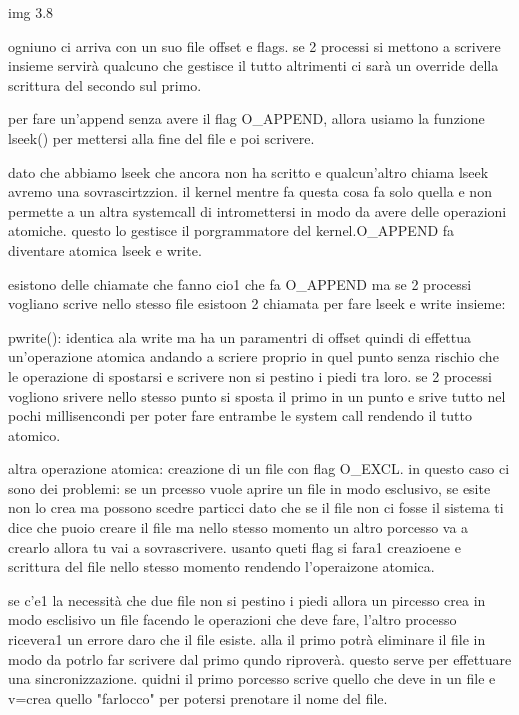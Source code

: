 img 3.8


ogniuno ci arriva con un suo file offset e flags. se 2 processi si mettono a scrivere insieme servirà qualcuno che gestisce il tutto altrimenti ci sarà un override della scrittura del secondo sul primo.







per fare un'append senza avere il flag O\_APPEND, allora usiamo la funzione lseek() per mettersi alla fine del file e poi scrivere.

dato che abbiamo lseek che ancora non ha scritto e qualcun'altro chiama lseek avremo una sovrascirtzzion. il kernel mentre fa questa cosa fa solo quella e non permette a un altra systemcall di intromettersi in modo da avere delle operazioni atomiche. questo lo gestisce il porgrammatore del kernel.O\_APPEND fa diventare atomica lseek e write.

esistono delle chiamate che fanno cio1 che fa O\_APPEND ma se 2 processi vogliano scrive nello stesso file esistoon 2 chiamata per fare lseek e write insieme:

pwrite(): identica ala write ma ha un paramentri di offset quindi di effettua un'operazione atomica andando a scriere proprio in quel punto senza rischio che le operazione di spostarsi e scrivere non si pestino i piedi tra loro. se 2 processi vogliono srivere nello stesso punto si sposta il primo in un punto e srive tutto nel pochi millisencondi per poter fare entrambe le system call rendendo il tutto atomico.

altra operazione atomica: creazione di un file con flag O\_EXCL. in questo caso ci sono dei problemi: se un prcesso vuole aprire un file in modo esclusivo, se esite non lo crea ma possono scedre particci dato che se il file non ci fosse il sistema ti dice che puoio creare il file ma nello stesso momento un altro porcesso va a crearlo allora tu vai a sovrascrivere. usanto queti flag si fara1 creazioene e scrittura del file nello stesso momento rendendo l'operaizone atomica.

se c'e1 la necessità che due file non si pestino i piedi allora un pircesso crea in modo esclisivo un file facendo le operazioni che deve fare, l'altro processo ricevera1 un errore daro che il file esiste. alla il primo potrà eliminare il file in modo da potrlo far scrivere dal primo qundo riproverà. questo serve per effettuare una sincronizzazione. quidni il primo porcesso scrive quello che deve in un file e v=crea quello "farlocco" per potersi prenotare il nome del file. 





